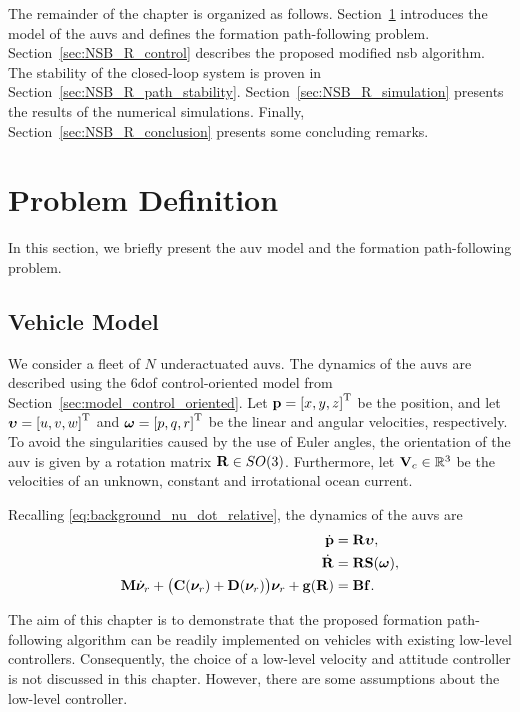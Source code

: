 The remainder of the chapter is organized as follows.
Section~\ref{sec:NSB_R_problem} introduces the model of the \glspl{auv} and defines the formation path-following problem.
Section~\ref{sec:NSB_R_control} describes the proposed modified \gls{nsb} algorithm.
The stability of the closed-loop system is proven in Section~\ref{sec:NSB_R_path_stability}.
Section~\ref{sec:NSB_R_simulation} presents the results of the numerical simulations.
Finally, Section~\ref{sec:NSB_R_conclusion} presents some concluding remarks.

\section{Problem Definition}
\label{sec:NSB_R_problem}
In this section, we briefly present the \gls{auv} model and the formation path-following problem.

\subsection{Vehicle Model}
We consider a fleet of $N$ underactuated \glspl{auv}.
The dynamics of the \glspl{auv} are described using the 6\gls{dof} control-oriented model from Section~\ref{sec:model_control_oriented}.
Let $\mathbf{p} = \left[x, y, z\right]^{\mathrm{T}}$ be the position, and let $\bm{\upsilon} = \left[u, v, w\right]^{\mathrm{T}}$ and $\bm{\omega} = \left[p, q, r\right]^{\mathrm{T}}$ be the linear and angular velocities, respectively.
To avoid the singularities caused by the use of Euler angles, the orientation of the \gls{auv} is given by a rotation matrix $\mathbf{R} \in SO(3)$.
Furthermore, let $\mathbf{V}_c \in \mathbb{R}^3$ be the velocities of an unknown, constant and irrotational ocean current.

Recalling \eqref{eq:background_nu_dot_relative}, the dynamics of the \glspl{auv} are
\begin{subequations}
\begin{align}
    \dot{\mathbf{p}} &= \mathbf{R} \bm{\upsilon}, \label{eq:NSB_R_p_dot}\\
    \dot{\mathbf{R}} &= \mathbf{R} \mathbf{S}(\bm{\omega}), \label{eq:NSB_R_R_dot} \\
    \mathbf{M} \dot{\bm{\nu}}_r
        + \bigl(\mathbf{C}(\bm{\nu}_r) + \mathbf{D}(\bm{\nu}_r)\bigr) \bm{\nu}_r + \mathbf{g}(\mathbf{R}) &= \mathbf{B}\mathbf{f}. \label{eq:NSB_R_nu_dot}
\end{align} \label{eq:NSB_R_matrix_vector_model}
\end{subequations}

The aim of this chapter is to demonstrate that the proposed formation path-following algorithm can be readily implemented on vehicles with existing low-level controllers.
Consequently, the choice of a low-level velocity and attitude controller is not discussed in this chapter.
However, there are some assumptions about the low-level controller.

